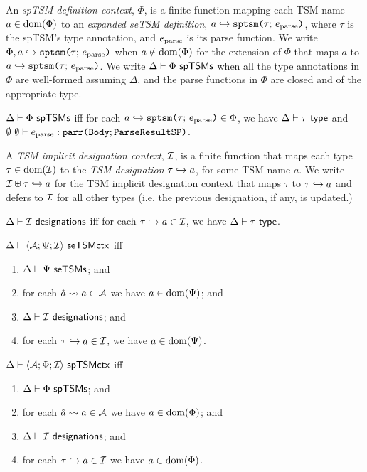 An \emph{spTSM definition context}, $\Phi$, is a finite function mapping each TSM name $a \in \text{dom}(\Phi)$ to an \emph{expanded seTSM definition}, $a \hookrightarrow \texttt{sptsm}\texttt{(}\tau;\,e_\text{parse}\texttt{)}$, where $\tau$ is the spTSM's type annotation, and $e_\text{parse}$ is its parse function. We write $\Phi, a \hookrightarrow \texttt{sptsm}\texttt{(}\tau;\,e_\text{parse}\texttt{)}$ when $a \notin \text{dom}(\Phi)$ for the extension of $\Phi$ that maps $a$ to $a \hookrightarrow \texttt{sptsm}\texttt{(}\tau;\,e_\text{parse}\texttt{)}$. We write $\Delta \vdash \Phi~\mathsf{spTSMs}$  when all the type annotations in $\Phi$ are well-formed assuming $\Delta$, and the parse functions in $\Phi$ are closed and of the appropriate type.

\begin{definition}\label{def:spTSM-def-ctx-formation} $\Delta \vdash \Phi~\mathsf{spTSMs}$ iff for each $a \hookrightarrow \texttt{sptsm}\texttt{(}\tau;\,e_\text{parse}\texttt{)} \in \Phi$, we have $\Delta \vdash \tau~\mathsf{type}$ and $\emptyset~\emptyset \vdash e_\text{parse} : \texttt{parr}\texttt{(}\mathtt{Body}; \mathtt{ParseResultSP}\texttt{)}$.\end{definition}

A \emph{TSM implicit designation context}, $\mathcal{I}$, is a finite function that maps each type $\tau \in \text{dom}(\mathcal{I})$ to the \emph{TSM designation} $\tau \hookrightarrow a$, for some TSM name $a$. We write $\mathcal{I} \uplus \tau \hookrightarrow a$ for the TSM implicit designation context that maps $\tau$ to $\tau \hookrightarrow a$ and defers to $\mathcal{I}$ for all other types (i.e. the previous designation, if any, is updated.)

\begin{definition}\label{def:implicit-designation-ctx-formation-S} $\Delta \vdash \mathcal{I}~\mathsf{designations}$ iff for each $\tau \hookrightarrow a \in \mathcal{I}$, we have $\Delta \vdash \tau~\mathsf{type}$.
\end{definition}

\begin{definition} $\Delta \vdash \langle \mathcal{A}; \Psi; \mathcal{I} \rangle~\mathsf{seTSMctx}$ iff
\begin{enumerate}
\item $\Delta \vdash \Psi~\mathsf{seTSMs}$; and
\item for each $\hat{a} \leadsto a \in \mathcal{A}$ we have $a \in \text{dom}(\Psi)$; and
\item $\Delta \vdash \mathcal{I}~\mathsf{designations}$; and
\item for each $\tau \hookrightarrow a \in \mathcal{I}$, we have $a \in \text{dom}(\Psi)$.
\end{enumerate}
\end{definition}

\begin{definition} $\Delta \vdash \langle \mathcal{A}; \Phi; \mathcal{I} \rangle~\mathsf{spTSMctx}$ iff 
\begin{enumerate}
\item $\Delta \vdash \Phi~\mathsf{spTSMs}$; and
\item for each $\hat{a} \leadsto a \in \mathcal{A}$ we have $a \in \text{dom}(\Phi)$; and
\item $\Delta \vdash \mathcal{I}~\mathsf{designations}$; and
\item for each $\tau \hookrightarrow a \in \mathcal{I}$ we have $a \in \text{dom}(\Phi)$.
\end{enumerate}
\end{definition}

